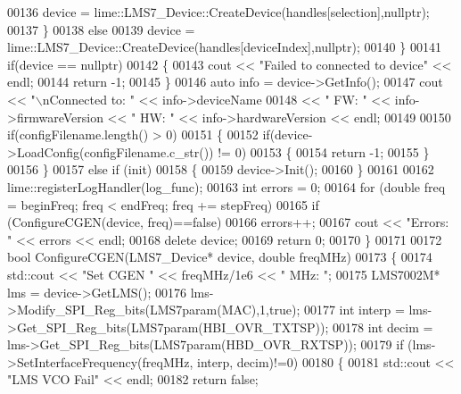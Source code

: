 \begin{DoxyCode}
00136             device = lime::LMS7_Device::CreateDevice(handles[selection],\textcolor{keyword}{nullptr});
00137         \}
00138         \textcolor{keywordflow}{else}
00139             device = lime::LMS7_Device::CreateDevice(handles[deviceIndex],\textcolor{keyword}{nullptr});
00140     \}
00141     \textcolor{keywordflow}{if}(device == \textcolor{keyword}{nullptr})
00142     \{
00143         cout << \textcolor{stringliteral}{"Failed to connected to device"} << endl;
00144         \textcolor{keywordflow}{return} -1;
00145     \}
00146     \textcolor{keyword}{auto} info = device->GetInfo();
00147     cout << \textcolor{stringliteral}{"\(\backslash\)nConnected to: "} << info->deviceName
00148     << \textcolor{stringliteral}{" FW: "} << info->firmwareVersion << \textcolor{stringliteral}{" HW: "} << info->hardwareVersion << endl;
00149 
00150     \textcolor{keywordflow}{if}(configFilename.length() > 0)
00151     \{
00152         \textcolor{keywordflow}{if}(device->LoadConfig(configFilename.c\_str()) != 0)
00153         \{
00154             \textcolor{keywordflow}{return} -1;
00155         \}
00156     \}
00157     \textcolor{keywordflow}{else} \textcolor{keywordflow}{if} (init)
00158     \{
00159         device->Init();
00160     \}
00161 
00162     lime::registerLogHandler(log_func);
00163     \textcolor{keywordtype}{int} errors = 0;
00164     \textcolor{keywordflow}{for} (\textcolor{keywordtype}{double} freq = beginFreq; freq < endFreq; freq += stepFreq)
00165         \textcolor{keywordflow}{if} (ConfigureCGEN(device, freq)==\textcolor{keyword}{false})
00166             errors++;
00167     cout << \textcolor{stringliteral}{"Errors: "} << errors << endl;
00168     \textcolor{keyword}{delete} device;
00169     \textcolor{keywordflow}{return} 0;
00170 \}
00171 
00172 \textcolor{keywordtype}{bool} ConfigureCGEN(LMS7_Device* device, \textcolor{keywordtype}{double} freqMHz)
00173 \{
00174     std::cout << \textcolor{stringliteral}{"Set CGEN "} << freqMHz/1e6 << \textcolor{stringliteral}{" MHz: "};
00175     LMS7002M* lms = device->GetLMS();
00176     lms->Modify_SPI_Reg_bits(LMS7param(MAC),1,\textcolor{keyword}{true});
00177     \textcolor{keywordtype}{int} interp = lms->Get_SPI_Reg_bits(LMS7param(HBI_OVR_TXTSP));
00178     \textcolor{keywordtype}{int} decim = lms->Get_SPI_Reg_bits(LMS7param(HBD_OVR_RXTSP));
00179     \textcolor{keywordflow}{if} (lms->SetInterfaceFrequency(freqMHz, interp, decim)!=0)
00180     \{
00181         std::cout << \textcolor{stringliteral}{"LMS VCO Fail"} << endl;
00182         \textcolor{keywordflow}{return} \textcolor{keyword}{false};

\end{DoxyCode}
